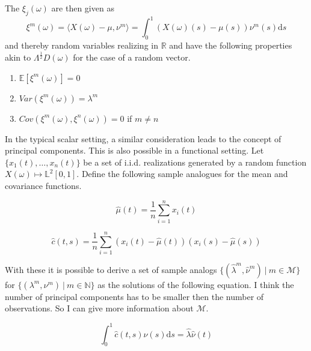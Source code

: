 \documentclass[11pt,twoside,a4paper]{article}
\begin{document}
	The $\xi_j(\omega)$ are then given as 
	\begin{equation}
		\xi^m(\omega) = \langle X(\omega) - \mu, \nu^m\rangle = \int_{0}^{1} \left(X(\omega)(s) - \mu(s)\right) \nu^m(s) \mathrm{d}s
	\end{equation} 
	and thereby random variables realizing in $\mathbb{R}$ and have the following properties akin to $\Lambda^{\frac{1}{2}} D(\omega)$ for the case of a random vector.
	
	\begin{multicols}{2}
		\begin{enumerate}
			\item $\mathbb{E}\left[\xi^m(\omega)\right] = 0$
			\item $Var\left(\xi^m(\omega)\right) = \lambda^m$
			\item $Cov\left(\xi^m(\omega), \xi^n(\omega)\right) = 0$ if $m \neq n$
		\end{enumerate}
	\end{multicols}
	
	In the typical scalar setting, a similar consideration leads to the concept of principal components. This is also possible in a functional setting. Let $\{x_1(t), \dots, x_n(t)\}$ be a set of i.i.d. realizations generated by a random function $X(\omega) \mapsto \mathbb{L}^2[0,1]$.
	Define the following sample analogues for the mean and covariance functions.
	
	\begin{equation}
		\hat{\mu}(t) = \frac{1}{n}\sum_{i = 1}^{n}x_i(t)
	\end{equation}
	
	\begin{equation}
		\hat{c}(t,s) = \frac{1}{n} \sum_{i = 1}^{n} \left(x_i(t) - \hat{\mu}(t)\right) \left(x_i(s) - \hat{\mu}(s)\right)
	\end{equation}
	
	With these it is possible to derive a set of sample analogs $\{(\hat{\lambda}^m, \hat{\nu}^m) \: \vert \: m \in \mathcal{M}\}$ for $\{(\lambda^m, \nu^m) \: \vert \: m \in \mathbb{N}\}$ as the solutions of the following equation. {\color{red} I think the number of principal components has to be smaller then the number of observations. So I can give more information about $\mathcal{M}$.}
	
	\begin{equation}
		\int_{0}^{1}\hat{c}(t,s)\hat{\nu}(s) \mathrm{d}s = \hat{\lambda} \hat{\nu}(t)
	\end{equation}
	
\end{document}
